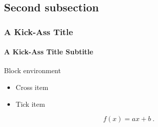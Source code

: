 \documentclass{beamer}
\newcommand{\tick}{\color{green!60!black!80}\ding{51}}
\newcommand{\cross}{\color{red!60!black!80}\ding{55}}
\begin{document}
\subsection{Second subsection}

\begin{frame}
  \frametitle{A Kick-Ass Title}
  \framesubtitle{A Kick-Ass Title Subtitle}
  \begin{block}{Block environment}
    \begin{itemize}
    \item[\cross] Cross item
    \item[\tick] Tick item
    \end{itemize}
  \end{block}
  \begin{equation}
    \label{eq:eq1}
    f(x)=ax+b \ .
  \end{equation}
\end{frame}
\end{document}
